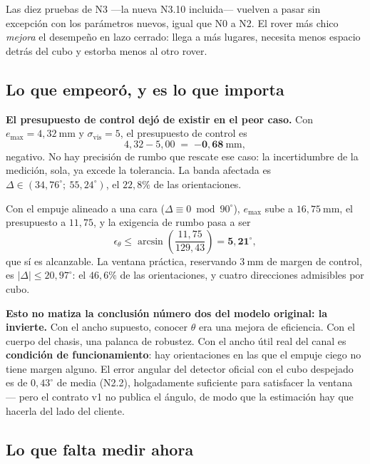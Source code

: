 \documentclass[11pt,a4paper]{article}
\newcommand{\grados}{^{\circ}}
\begin{document}
Las diez pruebas de N3 ---la nueva N3.10 incluida--- vuelven a pasar sin excepción con
los parámetros nuevos, igual que N0 a N2.
El rover más chico \emph{mejora} el desempeño en lazo cerrado: llega a más lugares,
necesita menos espacio detrás del cubo y estorba menos al otro rover.

\subsection{Lo que empeoró, y es lo que importa}

\begin{tcolorbox}[colback=black!5,colframe=black!65,boxrule=0.7pt,arc=1pt]
\textbf{El presupuesto de control dejó de existir en el peor caso.} Con
$e_{\max} = 4{,}32\ \mathrm{mm}$ y $\sigma_{\mathrm{vis}} = 5$, el presupuesto de control
es
\[
  4{,}32 - 5{,}00 \;=\; \mathbf{-0{,}68\ \mathrm{mm}} ,
\]
negativo. No hay precisión de rumbo que rescate ese caso: la incertidumbre de la
medición, sola, ya excede la tolerancia. La banda afectada es
$\Delta \in (34{,}76\grados;\ 55{,}24\grados)$, el $22{,}8\%$ de las orientaciones.

Con el empuje alineado a una cara ($\Delta \equiv 0 \bmod 90\grados$), $e_{\max}$ sube a
$16{,}75\ \mathrm{mm}$, el presupuesto a $11{,}75$, y la exigencia de rumbo pasa a ser
\[
  \epsilon_\theta \le \arcsin\!\left(\frac{11{,}75}{129{,}43}\right) = \mathbf{5{,}21\grados},
\]
que sí es alcanzable. La ventana práctica, reservando $3\ \mathrm{mm}$ de margen de
control, es $|\Delta| \le 20{,}97\grados$: el $46{,}6\%$ de las orientaciones, y cuatro
direcciones admisibles por cubo.

\medskip
\textbf{Esto no matiza la conclusión número dos del modelo original: la invierte.} Con
el ancho supuesto, conocer $\theta$ era una mejora de eficiencia. Con el cuerpo del
chasis, una palanca de robustez. Con el ancho útil real del canal es \textbf{condición
de funcionamiento}: hay orientaciones en las que el empuje ciego no tiene margen alguno.
El error angular del detector oficial con el cubo despejado es de $0{,}43\grados$ de
media (N2.2), holgadamente suficiente para satisfacer la ventana --- pero el contrato v1
no publica el ángulo, de modo que la estimación hay que hacerla del lado del cliente.
\end{tcolorbox}

\subsection{Lo que falta medir ahora}
\end{document}

